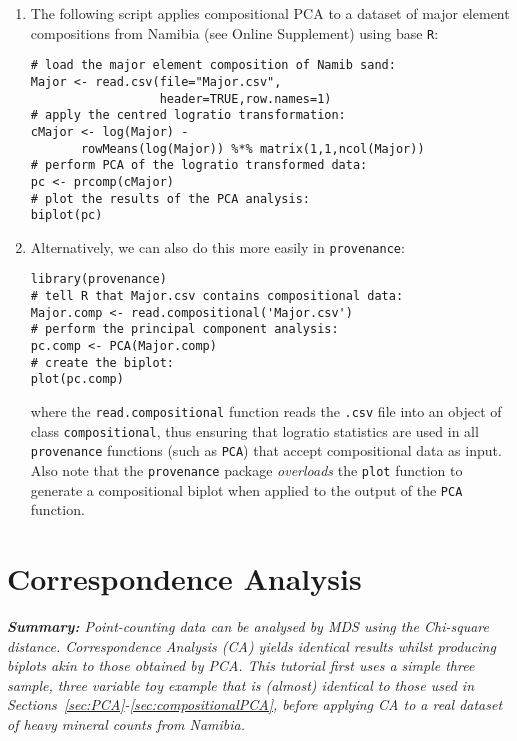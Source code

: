 \documentclass[11pt]{article}
\begin{document}
\begin{enumerate}
  \item The following script applies compositional PCA to a dataset of
    major element compositions from Namibia (see Online Supplement)
    using base \texttt{R}:

\begin{verbatim}
# load the major element composition of Namib sand:
Major <- read.csv(file="Major.csv",
                  header=TRUE,row.names=1)
# apply the centred logratio transformation:
cMajor <- log(Major) - 
       rowMeans(log(Major)) %*% matrix(1,1,ncol(Major))
# perform PCA of the logratio transformed data:
pc <- prcomp(cMajor)
# plot the results of the PCA analysis:
biplot(pc)
\end{verbatim}

\item Alternatively, we can also do this more easily in
  \texttt{provenance}:

\begin{verbatim}
library(provenance)
# tell R that Major.csv contains compositional data:
Major.comp <- read.compositional('Major.csv')
# perform the principal component analysis:
pc.comp <- PCA(Major.comp)
# create the biplot:
plot(pc.comp)
\end{verbatim}

  where the \texttt{read.compositional} function reads the
  \texttt{.csv} file into an object of class \texttt{compositional},
  thus ensuring that logratio statistics are used in all
  \texttt{provenance} functions (such as \texttt{PCA}) that accept
  compositional data as input. Also note that the \texttt{provenance}
  package \emph{overloads} the \texttt{plot} function to generate a
  compositional biplot when applied to the output of the \texttt{PCA}
  function.

\end{enumerate}

\section{Correspondence Analysis}
\label{sec:CA}

\textit{\textbf{Summary:} Point-counting data can be analysed by MDS
  using the Chi-square distance. Correspondence Analysis (CA) yields
  identical results whilst producing biplots akin to those obtained by
  PCA. This tutorial first uses a simple three sample, three variable
  toy example that is (almost) identical to those used in
  Sections~\ref{sec:PCA}-\ref{sec:compositionalPCA}, before applying
  CA to a real dataset of heavy mineral counts from Namibia.}\\
\end{document}
